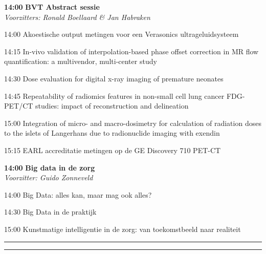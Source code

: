 \documentclass[a4paper,10pt]{report}
\begin{document}
\begin{multicols*}{3}
\vfill 

\begin{packed_enum}
\item[\textbf{14:00}]\textbf{BVT Abstract sessie}\\\textit{Voorzitters: Ronald Boellaard \& Jan Habraken}
\item[14:00] Akoestische output metingen voor een Verasonics ultrageluidsysteem
\item[14:15] In-vivo validation of interpolation-based phase offset cor\-rection in MR flow quantification: a multivendor, multi-center study
\item[14:30] Dose eval\-uation for digital x-ray imaging of premature neonates
\item[14:45] Repeatability of radiomics features in non-small cell lung cancer FDG-PET/CT studies: impact of reconstruction and delineation
\item[15:00] Integration of micro- and macro-dosimetry for calculation of radiation doses to the islets of Langerhans due to radionuclide imaging with exendin
\item[15:15] EARL accreditatie metingen op de GE Discovery 710 PET-CT
\end{packed_enum} %
 
\vfill

\begin{packed_enum}
\item[\textbf{14:00}] \textbf{Big data in de zorg}\\\textit{Voorzitter: Guido Zonneveld}
\item[14:00] Big Data: alles kan, maar mag ook alles?
\item[14:30] Big Data in de praktijk
\item[15:00] Kunstmatige intelligentie in de zorg: van toekomstbeeld naar realiteit
\end{packed_enum} %

\columnbreak

\hrule \vspace{2mm}
\vspace{2mm}\hrule\strut


\end{multicols*}
\end{document}
